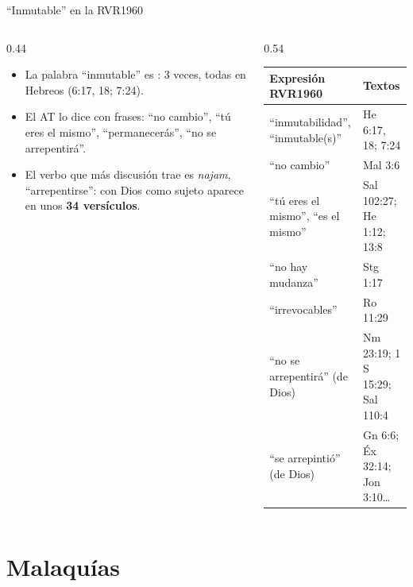 \begin{frame}{``Inmutable'' en la RVR1960}
\begin{columns}[c,onlytextwidth]
\begin{column}{0.44\textwidth}\footnotesize
\begin{itemize}
\item La palabra ``inmutable'' es : 3 veces, todas en Hebreos (6:17, 18; 7:24).
\item El AT lo dice con frases: ``no cambio'', ``tú eres el mismo'', ``permanecerás'', ``no se arrepentirá''.
\item El verbo que más discusión trae es  \emph{najam}, ``arrepentirse'': con Dios como sujeto aparece en unos \textbf{34 versículos}.
\end{itemize}
\end{column}
\begin{column}{0.54\textwidth}
\scriptsize\renewcommand{\arraystretch}{1.12}
\begin{tabular}{@{}>{\RaggedRight\arraybackslash}p{2.9cm}>{\RaggedRight\arraybackslash}p{3.2cm}@{}}
\toprule
\textbf{Expresión RVR1960} & \textbf{Textos} \\ \midrule
``inmutabilidad'', ``inmutable(s)'' & He 6:17, 18; 7:24 \\
``no cambio'' & Mal 3:6 \\
``tú eres el mismo'', ``es el mismo'' & Sal 102:27; He 1:12; 13:8 \\
``no hay mudanza'' & Stg 1:17 \\
``irrevocables'' & Ro 11:29 \\
``no se arrepentirá'' (de Dios) & Nm 23:19; 1 S 15:29; Sal 110:4 \\
``se arrepintió'' (de Dios) & Gn 6:6; Éx 32:14; Jon 3:10\ldots \\
\bottomrule
\end{tabular}
\end{column}
\end{columns}\par\smallskip
{}
\end{frame}

\section{Malaquías}

